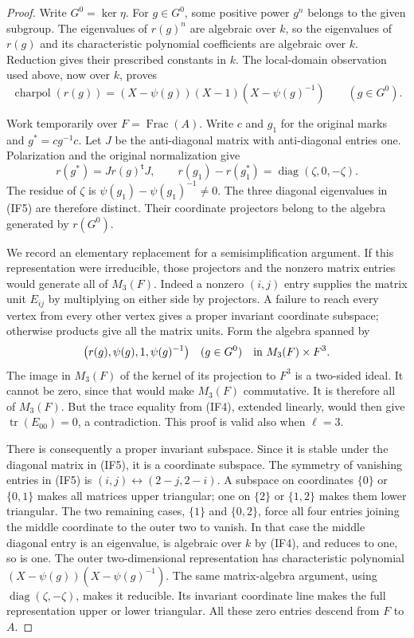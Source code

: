 \begin{proof}
Write $G^0=\ker\eta$.  For $g\in G^0$, some positive power $g^n$
belongs to the given subgroup.  The eigenvalues of $r(g)^n$ are
algebraic over $k$, so the eigenvalues of $r(g)$ and its characteristic
polynomial coefficients are algebraic over $k$.  Reduction gives
their prescribed constants in $k$.  The local-domain observation
used above, now over $k$, proves
\[
 \operatorname{charpol}(r(g))=(X-\psi(g))(X-1)(X-\psi(g)^{-1})
                 \qquad(g\in G^0).                           \tag{IF4}
\]

Work temporarily over $F=\operatorname{Frac}(A)$.  Write $c$ and
$g_1$ for the original marks and $g^*=cg^{-1}c$.  Let $J$ be the
anti-diagonal matrix with anti-diagonal entries one.  Polarization and
the original normalization give
\[
 r(g^*)=Jr(g)^{\mathsf t}J,\qquad
 r(g_1)-r(g_1^*)=\operatorname{diag}(\zeta,0,-\zeta).
                                                               \tag{IF5}
\]
The residue of $\zeta$ is $\psi(g_1)-\psi(g_1)^{-1}\ne0$.
The three diagonal eigenvalues in (IF5) are therefore distinct.
Their coordinate projectors belong to the algebra generated by
$r(G^0)$.

We record an elementary replacement for a semisimplification argument.
If this representation were irreducible, those projectors and the
nonzero matrix entries would generate all of $M_3(F)$.  Indeed a
nonzero $(i,j)$ entry supplies the matrix unit $E_{ij}$ by multiplying
on either side by projectors.  A failure to reach every vertex from
every other vertex gives a proper invariant coordinate subspace;
otherwise products give all the matrix units.  Form the algebra
spanned by
\[
       \bigl(r(g),\psi(g),1,\psi(g)^{-1}\bigr)
                  \quad(g\in G^0)
          \quad\hbox{in }M_3(F)\times F^3.
\]
The image in $M_3(F)$ of the kernel of its projection to $F^3$ is a
two-sided ideal.  It cannot be zero, since that would make $M_3(F)$
commutative.  It is therefore all of $M_3(F)$.  But the trace equality
from (IF4), extended linearly, would then give
$\operatorname{tr}(E_{00})=0$, a contradiction.  This proof is valid
also when $\ell=3$.

There is consequently a proper invariant subspace.  Since it is
stable under the diagonal matrix in (IF5), it is a coordinate
subspace.  The symmetry of vanishing entries in (IF5) is
$(i,j)\leftrightarrow(2-j,2-i)$.  A subspace on coordinates
$\{0\}$ or $\{0,1\}$ makes all matrices upper triangular; one
on $\{2\}$ or $\{1,2\}$ makes them lower triangular.  The two
remaining cases, $\{1\}$ and $\{0,2\}$, force all four entries
joining the middle coordinate to the outer two to vanish.
In that case the middle diagonal entry is an eigenvalue, is algebraic
over $k$ by (IF4), and reduces to one, so is one.  The outer
two-dimensional representation has characteristic polynomial
$(X-\psi(g))(X-\psi(g)^{-1})$.  The same matrix-algebra argument,
using $\operatorname{diag}(\zeta,-\zeta)$, makes it reducible.
Its invariant coordinate line makes the full representation upper
or lower triangular.  All these zero entries descend from $F$ to $A$.


\end{proof}
